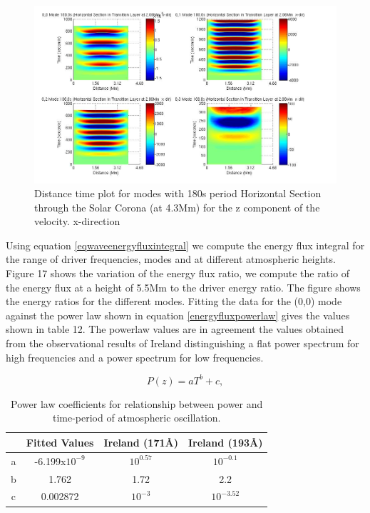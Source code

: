\documentclass[final,1p]{elsarticle}
\begin{document}
\begin{figure}[h]
\includegraphics[scale=0.5]{imagesn/dt_180_horiz_x_2p06Mm.jpg}
\caption{Distance time plot for modes with 180s period Horizontal Section through the Solar Corona (at 4.3Mm) for the z  component of the velocity. x-direction}
\end{figure}

Using equation \eqref{eqwaveenergyfluxintegral} we compute the energy flux integral for the range of driver frequencies, modes and at different atmospheric heights. Figure 17
shows the variation of the energy flux ratio, we compute the ratio of the energy flux at a height of 5.5Mm to the driver energy ratio.  The figure shows the energy ratios for the different modes. Fitting  the  data for the (0,0) mode against the power law shown in equation \eqref{energyfluxpowerlaw} gives the values shown in table 12. The powerlaw values are in agreement the values obtained from the observational results of Ireland \cite{Ireland2014} distinguishing a flat power spectrum for high frequencies and a power spectrum for low frequencies.

\begin{equation}\label{energyfluxpowerlaw}
P(z)= aT^{b}+c ,
\end{equation}


\begin{table}
\centering
\begin{tabular}{c c c c }
\hline
   &  Fitted Values & Ireland (171{\AA}) & Ireland (193{\AA}) \\
\hline
a & -6.199x$10^{-9}$ &  $10^{0.57}$ & $10^{-0.1}$ \\
\hline
b & 1.762 & 1.72 & 2.2 \\
\hline
c & 0.002872 & $10^{-3}$ & $10^{-3.52}$ \\
\hline
\end{tabular} 
\caption{ Power law coefficients for relationship between power and time-period of atmospheric oscillation.}
\end{table}
\end{document}
